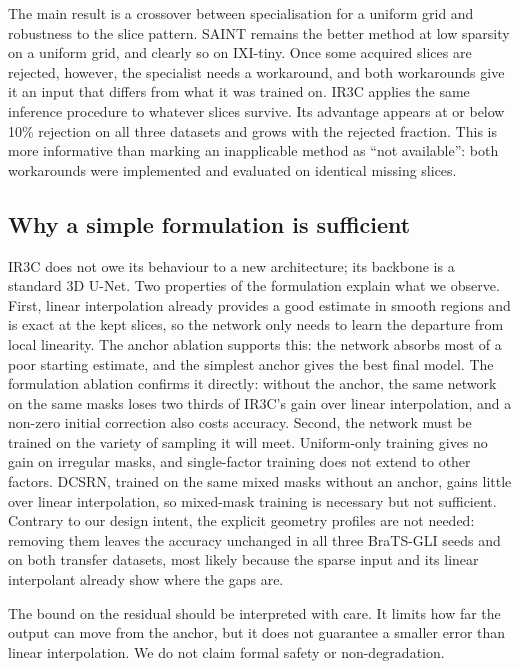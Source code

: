 \documentclass[a4paper,fleqn]{cas-dc}
\begin{document}
The main result is a crossover between specialisation for a uniform grid and robustness to
the slice pattern. SAINT remains the better method at low sparsity on a uniform grid, and
clearly so on IXI-tiny. Once some acquired slices are rejected, however, the specialist
needs a workaround, and both workarounds give it an input that differs from what it was
trained on. IR3C applies the same inference procedure to whatever slices survive. Its
advantage appears at or below 10\% rejection on all three datasets and grows with the rejected fraction. This is more
informative than marking an inapplicable method as ``not available'': both workarounds were
implemented and evaluated on identical missing slices.

\subsection{Why a simple formulation is sufficient}

IR3C does not owe its behaviour to a new architecture; its backbone is a standard 3D U-Net.
Two properties of the formulation explain what we observe. First, linear interpolation
already provides a good estimate in smooth regions and is exact at the kept slices, so the
network only needs to learn the departure from local linearity. The anchor ablation supports
this: the network absorbs most of a poor starting estimate, and the simplest anchor gives the
best final model. The formulation ablation confirms it directly: without the anchor, the
same network on the same masks loses two thirds of IR3C's gain over linear interpolation,
and a non-zero initial correction also costs accuracy. Second, the network must be trained
on the variety of sampling it will meet. Uniform-only training gives no gain on irregular
masks, and single-factor training does not extend to other factors. DCSRN, trained on the
same mixed masks without an anchor, gains little over linear interpolation, so mixed-mask
training is necessary but not sufficient. Contrary to our design intent, the explicit
geometry profiles are not needed: removing them leaves the accuracy unchanged in all three
BraTS-GLI seeds and on both transfer datasets, most likely because the sparse input and its
linear interpolant already show where the gaps are.

The bound on the residual should be interpreted with care. It limits how far the output can
move from the anchor, but it does not guarantee a smaller error than linear interpolation. We
do not claim formal safety or non-degradation.
\end{document}
